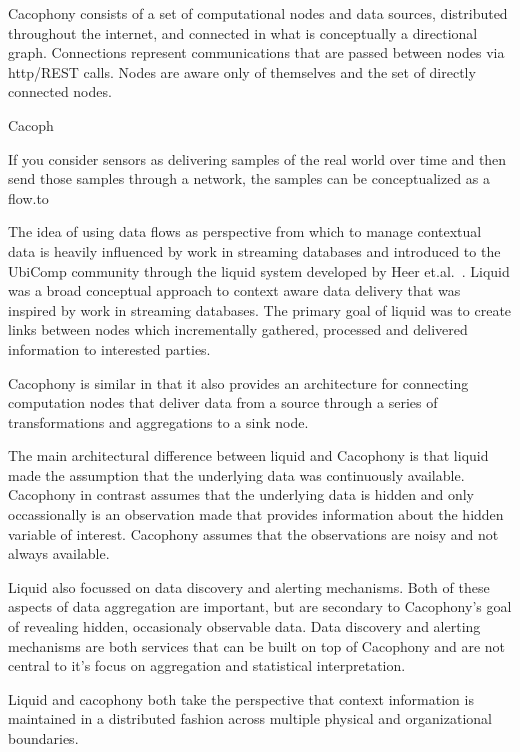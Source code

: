 Cacophony consists of a set of computational nodes and data sources, distributed throughout the
internet, and connected in what is conceptually a directional graph.  Connections
represent communications that are passed between nodes via http/REST calls. Nodes are
aware only of themselves and the set of directly connected nodes.







Cacoph

If you consider sensors as delivering samples of the real world over time and
then send those samples through a network, the samples can be conceptualized as
a flow.to 


The idea of using data flows as perspective from which to manage contextual data
is heavily influenced by work in streaming databases and introduced to the
UbiComp community through the liquid system developed by Heer
et.al.~\cite{HeerNBH03}.  Liquid was a broad conceptual approach to context
aware data delivery that was inspired by work in streaming databases.  The
primary goal of liquid was to create links between nodes which incrementally
gathered, processed and delivered information to interested parties.

Cacophony is similar in that it also provides an architecture for connecting
computation nodes that deliver data from a source through a series of
transformations and aggregations to a sink node.

The main architectural difference between liquid and Cacophony is that liquid
made the assumption that the underlying data was continuously available.
Cacophony in contrast assumes that the underlying data is hidden and only
occassionally is an observation made that provides information about the hidden
variable of interest.  Cacophony assumes that the observations are noisy and not
always available.

Liquid also focussed on data discovery and alerting mechanisms.  Both of these
aspects of data aggregation are important, but are secondary to Cacophony's goal
of revealing hidden, occasionaly observable data.  Data discovery and alerting
mechanisms are both services that can be built on top of Cacophony and are not
central to it's focus on aggregation and statistical interpretation. 

Liquid and cacophony both take the perspective that context information is
maintained in a distributed fashion across multiple physical and organizational
boundaries.

